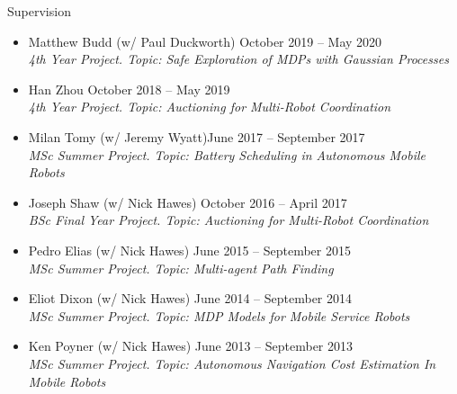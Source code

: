 \begin{rSection}{Supervision}
\begin{itemize}
\item Matthew Budd  (w/ Paul Duckworth)  \hfill October 2019 -- May 2020\\
\textit{4th Year Project. Topic: Safe Exploration of MDPs with Gaussian Processes}

\item Han Zhou \hfill October 2018 -- May 2019\\
\textit{4th Year Project. Topic: Auctioning for Multi-Robot Coordination}

\item   Milan Tomy (w/ Jeremy Wyatt)\hfill June 2017 -- September 2017\\
\textit{MSc Summer Project. Topic: Battery Scheduling in Autonomous Mobile Robots}

\item   Joseph Shaw (w/ Nick Hawes) \hfill October 2016 -- April 2017\\
\textit{BSc Final Year Project. Topic: Auctioning for Multi-Robot Coordination}

\item  Pedro Elias (w/ Nick Hawes)  \hfill June 2015 -- September 2015\\
\textit{MSc Summer Project. Topic: Multi-agent Path Finding}

\item  Eliot Dixon  (w/ Nick Hawes) \hfill June 2014 -- September 2014\\
\textit{MSc Summer Project. Topic: MDP Models for Mobile Service Robots}

\item  Ken Poyner (w/ Nick Hawes) \hfill June 	2013 -- September 2013\\
\textit{MSc Summer Project. Topic: Autonomous Navigation Cost Estimation In Mobile Robots}

\end{itemize}

\end{rSection}

